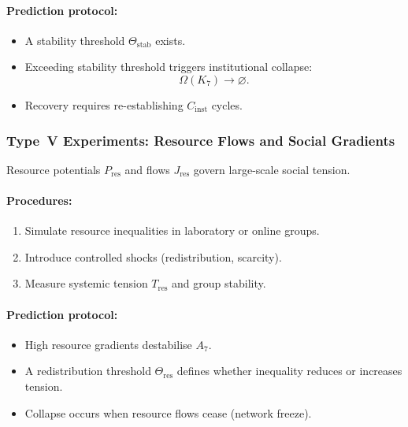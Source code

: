\paragraph{Prediction protocol:}

\begin{itemize}
    \item A stability threshold $\Theta_{\mathrm{stab}}$ exists.
    \item Exceeding stability threshold triggers institutional collapse:
          \[
             \Omega(K_7) \rightarrow \varnothing.
          \]
    \item Recovery requires re-establishing $C_{\mathrm{inst}}$ cycles.
\end{itemize}



\subsubsection{Type~V Experiments: Resource Flows and Social Gradients}

Resource potentials $P_{\mathrm{res}}$ and flows $J_{\mathrm{res}}$
govern large-scale social tension.

\paragraph{Procedures:}

\begin{enumerate}
    \item Simulate resource inequalities in laboratory or online groups.
    \item Introduce controlled shocks (redistribution, scarcity).
    \item Measure systemic tension $T_{\mathrm{res}}$ and group stability.
\end{enumerate}

\paragraph{Prediction protocol:}

\begin{itemize}
    \item High resource gradients destabilise $A_7$.
    \item A redistribution threshold $\Theta_{\mathrm{res}}$ defines
          whether inequality reduces or increases tension.
    \item Collapse occurs when resource flows cease (network freeze).
\end{itemize}



